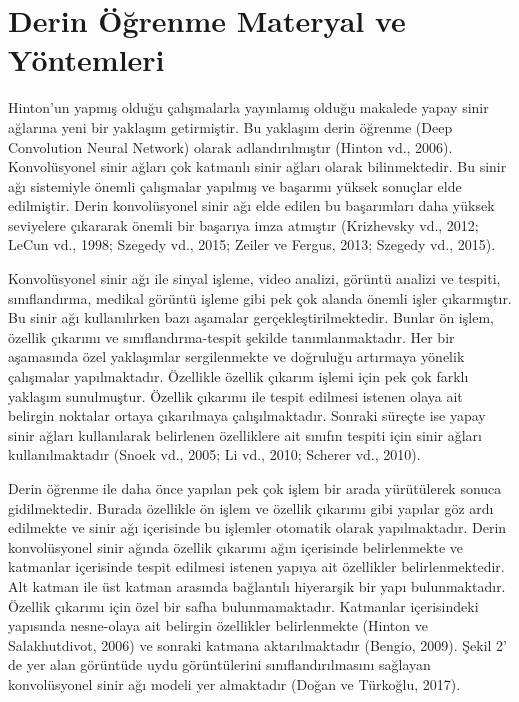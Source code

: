 \documentclass{article}
\begin{document}
\section{Derin Öğrenme Materyal ve Yöntemleri}
\vspace{10pt}


Hinton’un yapmış olduğu çalışmalarla
yayınlamış olduğu makalede yapay sinir ağlarına
yeni bir yaklaşım getirmiştir. Bu yaklaşım derin
öğrenme (Deep Convolution Neural Network)
olarak adlandırılmıştır (Hinton vd., 2006).
Konvolüsyonel sinir ağları çok katmanlı sinir
ağları olarak bilinmektedir. Bu sinir ağı
sistemiyle önemli çalışmalar yapılmış ve
başarımı yüksek sonuçlar elde edilmiştir. Derin
konvolüsyonel sinir ağı elde edilen bu
başarımları daha yüksek seviyelere çıkararak
önemli bir başarıya imza atmıştır (Krizhevsky
vd., 2012; LeCun vd., 1998; Szegedy vd., 2015;
Zeiler ve Fergus, 2013; Szegedy vd., 2015). 

\newpage

Konvolüsyonel sinir ağı ile sinyal işleme, video
analizi, görüntü analizi ve tespiti, sınıflandırma,
medikal görüntü işleme gibi pek çok alanda
önemli işler çıkarmıştır. Bu sinir ağı kullanılırken
bazı aşamalar gerçekleştirilmektedir. Bunlar ön
işlem, özellik çıkarımı ve sınıflandırma-tespit
şekilde tanımlanmaktadır. Her bir aşamasında
özel yaklaşımlar sergilenmekte ve doğruluğu
artırmaya yönelik çalışmalar yapılmaktadır.
Özellikle özellik çıkarım işlemi için pek çok
farklı yaklaşım sunulmuştur. Özellik çıkarımı ile
tespit edilmesi istenen olaya ait belirgin noktalar ortaya çıkarılmaya çalışılmaktadır. Sonraki
süreçte ise yapay sinir ağları kullanılarak
belirlenen özelliklere ait sınıfın tespiti için sinir
ağları kullanılmaktadır (Snoek vd., 2005; Li vd.,
2010; Scherer vd., 2010).
\vspace{10pt}

Derin öğrenme ile daha önce yapılan pek çok
işlem bir arada yürütülerek sonuca gidilmektedir.
Burada özellikle ön işlem ve özellik çıkarımı gibi
yapılar göz ardı edilmekte ve sinir ağı içerisinde
bu işlemler otomatik olarak yapılmaktadır. Derin
konvolüsyonel sinir ağında özellik çıkarımı ağın
içerisinde belirlenmekte ve katmanlar içerisinde
tespit edilmesi istenen yapıya ait özellikler
belirlenmektedir. Alt katman ile üst katman
arasında bağlantılı hiyerarşik bir yapı
bulunmaktadır. Özellik çıkarımı için özel bir
safha bulunmamaktadır. Katmanlar içerisindeki
yapısında nesne-olaya ait belirgin özellikler
belirlenmekte (Hinton ve Salakhutdivot, 2006)
ve sonraki katmana aktarılmaktadır (Bengio,
2009). Şekil 2’ de yer alan görüntüde uydu
görüntülerini sınıflandırılmasını sağlayan
konvolüsyonel sinir ağı modeli yer almaktadır
(Doğan ve Türkoğlu, 2017). 
\end{document}
